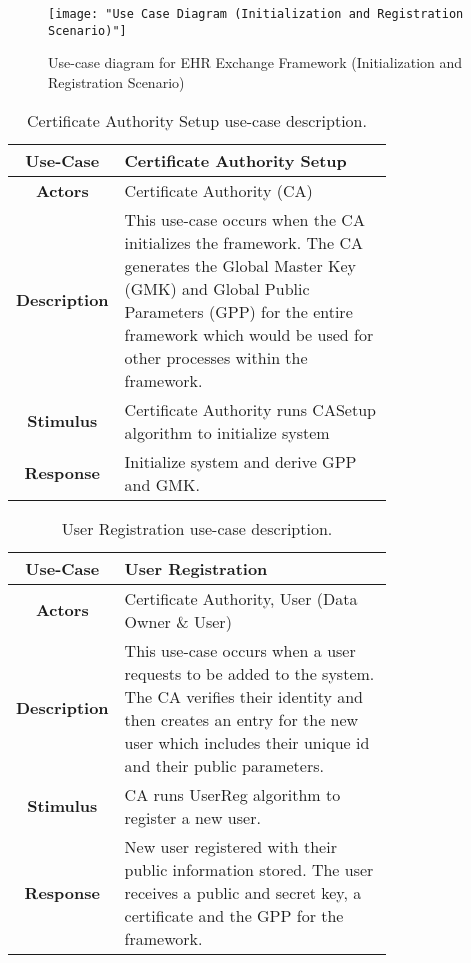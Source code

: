 \begin{figure}[]
	\centering
	\texttt{[image: "Use Case Diagram (Initialization and Registration Scenario)"]}
	\caption{Use-case diagram for EHR Exchange Framework (Initialization and Registration Scenario)}
	\label{fig:use_case_ini}
\end{figure}

\begin{table}[]
	\centering
	\begin{tabular}{|c|p{0.75\linewidth}|}
		\hline
		\textbf{Use-Case}    & Certificate Authority Setup                                  \\ \hline
		\textbf{Actors}      & Certificate Authority (CA)                        \\ \hline
		\textbf{Description} & This use-case occurs when the CA initializes the framework. The CA generates the Global Master Key (GMK) and Global Public Parameters (GPP) for the entire framework which would be used for other processes within the framework. \\ \hline
		\textbf{Stimulus}    & Certificate Authority runs CASetup algorithm to initialize system                     \\ \hline
		\textbf{Response}    & Initialize system and derive GPP and GMK.             \\ \hline
	\end{tabular}
	\caption{Certificate Authority Setup use-case description.}
	\label{tab:use_case_casetup}
\end{table}

\begin{table}[]
	\centering
	\begin{tabular}{|c|p{0.75\linewidth}|}
		\hline
		\textbf{Use-Case}    & User Registration                                   \\ \hline
		\textbf{Actors}      & Certificate Authority, User (Data Owner \& User)                        \\ \hline
		\textbf{Description} & This use-case occurs when a user requests to be added to the system. The CA verifies their identity and then creates an entry for the new user which includes their unique id and their public parameters.  \\ \hline
		\textbf{Stimulus}    & CA runs UserReg algorithm to register a new user.                    \\ \hline
		\textbf{Response}    & New user registered with their public information stored. The user receives a public and secret key, a certificate and the GPP for the framework.             \\ \hline
	\end{tabular}
	\caption{User Registration use-case description.}
	\label{tab:use_case_userreg}
\end{table}

